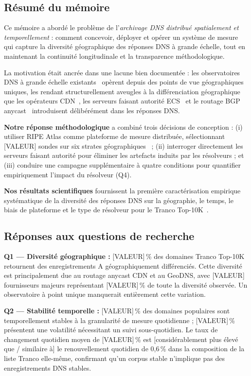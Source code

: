 \subsection{Résumé du mémoire}
\label{subsec:5.5.1}

Ce mémoire a abordé le problème de l'\textit{archivage DNS distribué spatialement et temporellement} : comment concevoir, déployer et opérer un système de mesure qui capture la diversité géographique des réponses DNS à grande échelle, tout en maintenant la continuité longitudinale et la transparence méthodologique.

La motivation était ancrée dans une lacune bien documentée : les observatoires DNS à grande échelle existants~\cite{vanRijswijk2016} opèrent depuis des points de vue géographiques uniques, les rendant structurellement aveugles à la différenciation géographique que les opérateurs CDN~\cite{Calder2015,Koch2021}, les serveurs faisant autorité ECS~\cite{RFC7871,Wang2018} et le routage BGP anycast~\cite{Bortzmeyer2013,Finnegan2018} introduisent délibérément dans les réponses DNS.

\textbf{Notre réponse méthodologique} a combiné trois décisions de conception : (i) utiliser RIPE Atlas comme plateforme de mesure distribuée, sélectionnant [VALEUR] sondes sur six strates géographiques~\cite{Bajpai2017} ; (ii) interroger directement les serveurs faisant autorité pour éliminer les artefacts induits par les résolveurs ; et (iii) conduire une campagne supplémentaire à quatre conditions pour quantifier empiriquement l'impact du résolveur (Q4).

\textbf{Nos résultats scientifiques} fournissent la première caractérisation empirique systématique de la diversité des réponses DNS sur la géographie, le temps, le biais de plateforme et le type de résolveur pour le Tranco Top-10K~\cite{LePochat2019}.
\bigskip
\subsection{Réponses aux questions de recherche}
\label{subsec:5.5.2}

\textbf{Q1 --- Diversité géographique :} [VALEUR]\,\% des domaines Tranco Top-10K retournent des enregistrements A géographiquement différenciés. Cette diversité est principalement due au routage anycast CDN et au GeoDNS, avec [VALEUR] fournisseurs majeurs représentant [VALEUR]\,\% de toute la diversité observée. Un observatoire à point unique manquerait entièrement cette variation.

\textbf{Q2 --- Stabilité temporelle :} [VALEUR]\,\% des domaines populaires sont temporellement stables à la granularité de mesure quotidienne ; [VALEUR]\,\% présentent une volatilité nécessitant un suivi sous-quotidien. Le taux de changement quotidien moyen de [VALEUR]\,\% est [considérablement plus élevé que / similaire à] le renouvellement quotidien de 0,6\,\% dans la composition de la liste Tranco elle-même, confirmant qu'un corpus stable n'implique pas des enregistrements DNS stables.


